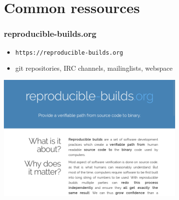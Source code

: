 \documentclass[14pt,aspectratio=169]{beamer}
\begin{document}
\section{Common ressources}

\begin{frame}
 \frametitle{reproducible-builds.org}

 \begin{itemize}
  \item \texttt{https://reproducible-builds.org}
  \item git repositories, IRC channels, mailinglists, webspace
 \end{itemize}
 \begin{center}
 \includegraphics[width=0.7\textwidth]{images/rbwww1.png}
 \end{center}
\end{frame}
\end{document}
